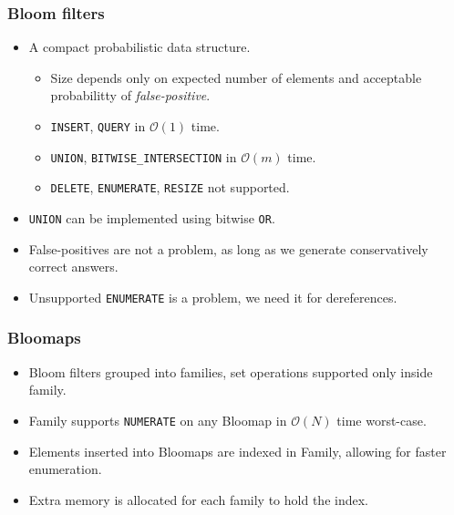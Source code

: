\documentclass{beamer}
\begin{document}

\begin{frame}[t]
\frametitle{Bloom filters}
\begin{itemize}
		\item A compact probabilistic data structure.
		\begin{itemize}
			\item Size depends only on expected number of elements and
				acceptable probabilitty of {\it false-positive}.
			\item {\tt INSERT}, {\tt QUERY} in $\mathcal{O}(1)$ time.
			\item {\tt UNION}, {\tt BITWISE\_INTERSECTION} in $\mathcal{O}(m)$ time.
			\item {\tt DELETE}, {\tt ENUMERATE}, {\tt RESIZE} not supported.
		\end{itemize}
		\pause
	\item {\tt UNION} can be implemented using bitwise {\tt OR}.
		\pause
	\item False-positives are not a problem, as long as we generate
		conservatively correct answers.
		\pause
	\item Unsupported {\tt ENUMERATE} is a problem, we need it for dereferences.
\end{itemize}
\end{frame}


\begin{frame}[t]
\frametitle{Bloomaps}
\begin{itemize}
		\item Bloom filters grouped into families, set operations supported only
			inside family.
		\pause
		\item Family supports {\tt NUMERATE} on any Bloomap in $\mathcal{O}(N)$
			time worst-case.
		\pause
		\item Elements inserted into Bloomaps are indexed in Family, allowing
			for faster enumeration.
		\pause
		\item Extra memory is allocated for each family to hold the index.
\end{itemize}
\end{frame}

\end{document}
